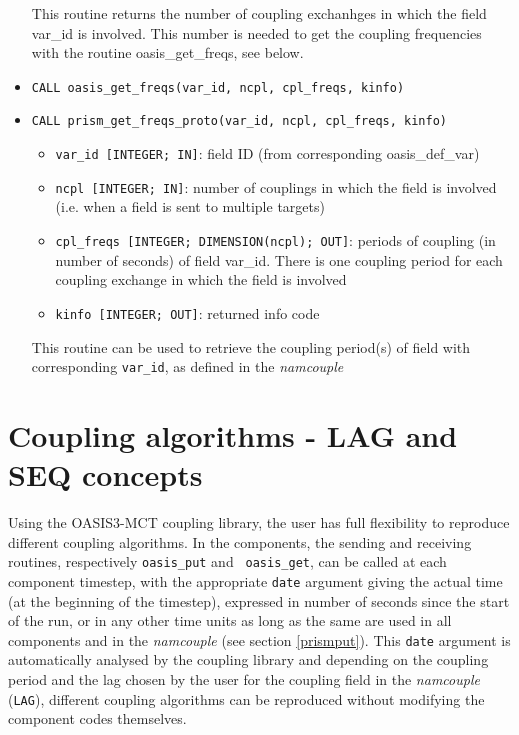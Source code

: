 \begin{itemize}
This routine returns the number of coupling exchanhges in which the field var\_id is
involved. This number is needed to get the coupling frequencies with the
routine oasis\_get\_freqs, see below.

\item {\tt CALL oasis\_get\_freqs(var\_id, ncpl, cpl\_freqs, kinfo)}
\item {\tt CALL prism\_get\_freqs\_proto(var\_id, ncpl, cpl\_freqs, kinfo)}
  \begin{itemize}
  \item {\tt var\_id [INTEGER; IN]}: field ID (from
  corresponding oasis\_def\_var)
  \item {\tt ncpl [INTEGER; IN]}: number of couplings in which the field
  is involved (i.e. when a field is sent to multiple targets)
   \item {\tt cpl\_freqs [INTEGER; DIMENSION(ncpl); OUT]}: periods of coupling 
  (in number of seconds) of field var\_id. There is one coupling period for
  each coupling exchange in which the field is involved
  \item {\tt kinfo [INTEGER; OUT]}: returned info code
  \end{itemize}

This routine can be used to retrieve the coupling period(s) of field with
corresponding {\tt var\_id}, as defined in the {\it namcouple}

\end{itemize}

\section{Coupling algorithms - LAG and SEQ concepts}
\label{subsubsec_Algoritms}

Using the OASIS3-MCT coupling library, the user has full flexibility
to reproduce different coupling algorithms. In the components, the
sending and receiving routines, respectively {\tt oasis\_put} and {\tt
  oasis\_get}, can be called at each component timestep, with the
appropriate {\tt date} argument giving the actual time (at the
beginning of the timestep), expressed in number of seconds since the
start of the run, or in any other time units as long as the same are
used in all components and in the {\it namcouple} (see section
\ref{prismput}). This {\tt date} argument is automatically analysed by
the coupling library and depending on the coupling period and the lag chosen by the user for the coupling field in the {\it namcouple} ({\tt LAG}), different coupling algorithms can be reproduced
without modifying the component codes themselves.

